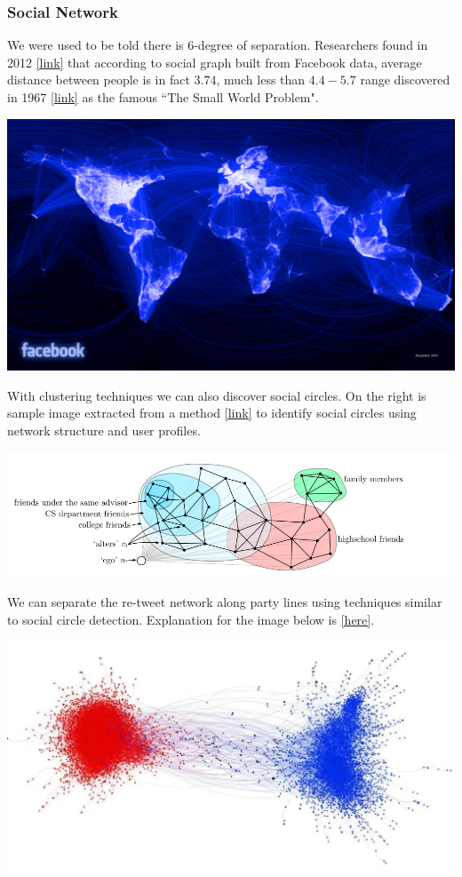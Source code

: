 \subsubsection{Social Network}

We were used to be told there is 6-degree of separation. Researchers found in 2012 \href{https://web.stanford.edu/~jugander/papers/websci12-fourdegrees.pdf}{[link]} that according to social graph built from Facebook data, average distance between people is in fact $3.74$, much less than $4.4 - 5.7$ range discovered in 1967 \href{shorturl.at/gCMSU}{[link]} as the famous ``The Small World Problem".

{
\centering
\includegraphics[width=0.75\linewidth]{img/n1_fb.png} \par
}

With clustering techniques we can also discover social circles. On the right is sample image extracted from a method \href{https://cs.stanford.edu/people/jure/pubs/circles-nips12.pdf}{[link]} to identify social circles using network structure and user profiles.

{
\centering
\includegraphics[width=0.85\linewidth]{img/n1_social.png} \par
}

We can separate the re-tweet network along party lines  using techniques similar to social circle detection. Explanation for the image below is \href{https://qz.com/1024117/one-visualization-shows-how-morally-outraged-tweets-stay-within-their-political-bubble/}{[here]}.

{
\centering
\includegraphics[width=0.6\linewidth]{img/n1_twitter.jpg} \par
}



